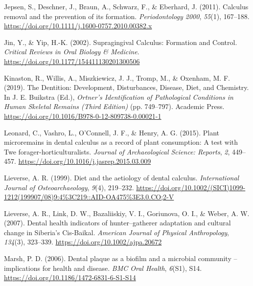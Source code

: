 \documentclass[
  letterpaper,
]{book}
\newlength{\cslhangindent}
\newlength{\cslentryspacingunit} %
\newenvironment{CSLReferences}[2] %
 {%
  \setlength{\parindent}{0pt}
  \ifodd #1
  \let\oldpar\par
  \def\par{\hangindent=\cslhangindent\oldpar}
  \fi
  \setlength{\parskip}{#2\cslentryspacingunit}
 }%
 {}
\begin{document}
\begin{CSLReferences}{1}{0}
\leavevmode{}%
Jepsen, S., Deschner, J., Braun, A., Schwarz, F., \& Eberhard, J.
(2011). Calculus removal and the prevention of its formation.
\emph{Periodontology 2000}, \emph{55}(1), 167--188.
\url{https://doi.org/10.1111/j.1600-0757.2010.00382.x}

\leavevmode{}%
Jin, Y., \& Yip, H.-K. (2002). Supragingival {Calculus}: {Formation} and
{Control}. \emph{Critical Reviews in Oral Biology \& Medicine}.
\url{https://doi.org/10.1177/154411130201300506}

\leavevmode{}%
Kinaston, R., Willis, A., Miszkiewicz, J. J., Tromp, M., \& Oxenham, M.
F. (2019). The {Dentition}: {Development}, {Disturbances}, {Disease},
{Diet}, and {Chemistry}. In J. E. Buikstra (Ed.), \emph{Ortner's
{Identification} of {Pathological Conditions} in {Human Skeletal
Remains} ({Third Edition})} (pp. 749--797). {Academic Press}.
\url{https://doi.org/10.1016/B978-0-12-809738-0.00021-1}

\leavevmode{}%
Leonard, C., Vashro, L., O'Connell, J. F., \& Henry, A. G. (2015). Plant
microremains in dental calculus as a record of plant consumption: {A}
test with {Twe} forager-horticulturalists. \emph{Journal of
Archaeological Science: Reports}, \emph{2}, 449--457.
\url{https://doi.org/10.1016/j.jasrep.2015.03.009}

\leavevmode{}%
Lieverse, A. R. (1999). Diet and the aetiology of dental calculus.
\emph{International Journal of Osteoarchaeology}, \emph{9}(4), 219--232.
\url{https://doi.org/10.1002/(SICI)1099-1212(199907/08)9:4\%3C219::AID-OA475\%3E3.0.CO;2-V}

\leavevmode{}%
Lieverse, A. R., Link, D. W., Bazaliiskiy, V. I., Goriunova, O. I., \&
Weber, A. W. (2007). Dental health indicators of hunter--gatherer
adaptation and cultural change in {Siberia}'s {Cis-Baikal}.
\emph{American Journal of Physical Anthropology}, \emph{134}(3),
323--339. \url{https://doi.org/10.1002/ajpa.20672}

\leavevmode{}%
Marsh, P. D. (2006). Dental plaque as a biofilm and a microbial
community -- implications for health and disease. \emph{BMC Oral
Health}, \emph{6}(S1), S14.
\url{https://doi.org/10.1186/1472-6831-6-S1-S14}


\end{CSLReferences}
\end{document}
